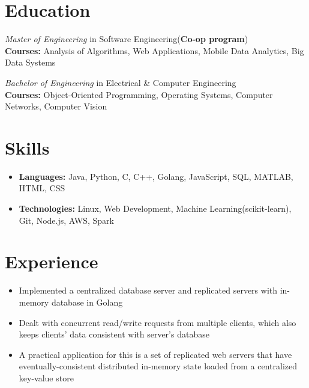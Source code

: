 \documentclass{resume}
\begin{document}



\section{Education}
\textit{Master of Engineering} in Software Engineering(\textbf{Co-op program})\\
\textbf{Courses: }Analysis of Algorithms, Web Applications, Mobile Data Analytics, Big Data Systems

\textit{Bachelor of Engineering} in Electrical \& Computer Engineering\\
\textbf{Courses: }Object-Oriented Programming, Operating Systems, Computer Networks, Computer Vision

\section{Skills}
\begin{itemize}[parsep=0.5ex]
  \item \textbf{Languages: }Java, Python, C, C++, Golang, JavaScript, SQL, MATLAB, HTML, CSS
  \item \textbf{Technologies: }Linux, Web Development, Machine Learning(scikit-learn), Git, Node.js, AWS, Spark
\end{itemize}



\section{Experience}

\begin{itemize}
  \item  Implemented a centralized database server and replicated servers with in-memory database in Golang 
  \item Dealt with concurrent read/write requests from multiple clients, which also keeps clients' data consistent with server's database
  \item A practical application for this is a set of replicated web servers that have eventually-consistent distributed in-memory state loaded from a centralized key-value store
\end{itemize}
\end{document}
